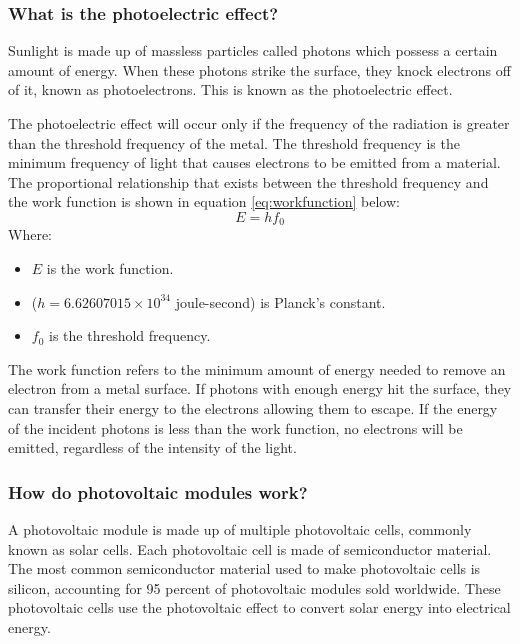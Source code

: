 \subsubsection{What is the photoelectric effect?}
Sunlight is made up of massless particles called photons which possess a certain amount of energy. When these photons strike the surface, they knock electrons off of it, known as photoelectrons. This is known as the photoelectric effect.\vspace{0.5em}

\noindent The photoelectric effect will occur only if the frequency of the radiation is greater than the threshold frequency of the metal. The threshold frequency is the minimum frequency of light that causes electrons to be emitted from a material. The proportional relationship that exists between the threshold frequency and the work function is shown in equation \ref{eq:workfunction} below:
\begin{equation}
    E = hf_0
    \label{eq:workfunction}
\end{equation}
Where:
\begin{itemize}
    \item $E$ is the work function.
    \item ($h = 6.62607015 \times 10^{34}$ joule-second) is Planck's constant.
    \item $f_0$ is the threshold frequency. 
\end{itemize}\vspace{0.5em}
\noindent The work function refers to the minimum amount of energy needed to remove an electron from a metal surface. If photons with enough energy hit the surface, they can transfer their energy to the electrons allowing them to escape. If the energy of the incident photons is less than the work function, no electrons will be emitted, regardless of the intensity of the light.\vspace{0.5em}

\subsubsection{How do photovoltaic modules work?}
A photovoltaic module is made up of multiple photovoltaic cells, commonly known as solar cells. Each photovoltaic cell is made of semiconductor material. The most common semiconductor material used to make photovoltaic cells is silicon, accounting for 95 percent of photovoltaic modules sold worldwide. These photovoltaic cells use the photovoltaic effect to convert solar energy into electrical energy.\vspace{0.5em}

